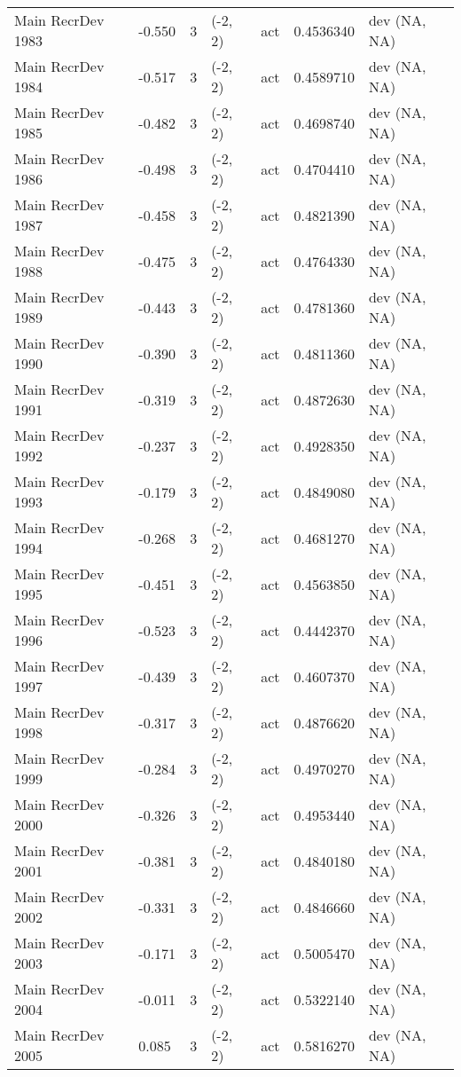 \documentclass[11pt,
  english,
  a4paper,
]{article}
\begin{document}
\begin{landscape}
\begin{longtable}[t]{>{\raggedright\arraybackslash}p{6cm}lllll>{\raggedright\arraybackslash}p{4cm}}
Main RecrDev 1983 & -0.550 & 3 & (-2, 2) & act & 0.4536340 & dev (NA, NA)\\
Main RecrDev 1984 & -0.517 & 3 & (-2, 2) & act & 0.4589710 & dev (NA, NA)\\
Main RecrDev 1985 & -0.482 & 3 & (-2, 2) & act & 0.4698740 & dev (NA, NA)\\
Main RecrDev 1986 & -0.498 & 3 & (-2, 2) & act & 0.4704410 & dev (NA, NA)\\
Main RecrDev 1987 & -0.458 & 3 & (-2, 2) & act & 0.4821390 & dev (NA, NA)\\
Main RecrDev 1988 & -0.475 & 3 & (-2, 2) & act & 0.4764330 & dev (NA, NA)\\
Main RecrDev 1989 & -0.443 & 3 & (-2, 2) & act & 0.4781360 & dev (NA, NA)\\
Main RecrDev 1990 & -0.390 & 3 & (-2, 2) & act & 0.4811360 & dev (NA, NA)\\
Main RecrDev 1991 & -0.319 & 3 & (-2, 2) & act & 0.4872630 & dev (NA, NA)\\
Main RecrDev 1992 & -0.237 & 3 & (-2, 2) & act & 0.4928350 & dev (NA, NA)\\
Main RecrDev 1993 & -0.179 & 3 & (-2, 2) & act & 0.4849080 & dev (NA, NA)\\
Main RecrDev 1994 & -0.268 & 3 & (-2, 2) & act & 0.4681270 & dev (NA, NA)\\
Main RecrDev 1995 & -0.451 & 3 & (-2, 2) & act & 0.4563850 & dev (NA, NA)\\
Main RecrDev 1996 & -0.523 & 3 & (-2, 2) & act & 0.4442370 & dev (NA, NA)\\
Main RecrDev 1997 & -0.439 & 3 & (-2, 2) & act & 0.4607370 & dev (NA, NA)\\
Main RecrDev 1998 & -0.317 & 3 & (-2, 2) & act & 0.4876620 & dev (NA, NA)\\
Main RecrDev 1999 & -0.284 & 3 & (-2, 2) & act & 0.4970270 & dev (NA, NA)\\
Main RecrDev 2000 & -0.326 & 3 & (-2, 2) & act & 0.4953440 & dev (NA, NA)\\
Main RecrDev 2001 & -0.381 & 3 & (-2, 2) & act & 0.4840180 & dev (NA, NA)\\
Main RecrDev 2002 & -0.331 & 3 & (-2, 2) & act & 0.4846660 & dev (NA, NA)\\
Main RecrDev 2003 & -0.171 & 3 & (-2, 2) & act & 0.5005470 & dev (NA, NA)\\
Main RecrDev 2004 & -0.011 & 3 & (-2, 2) & act & 0.5322140 & dev (NA, NA)\\
Main RecrDev 2005 & 0.085 & 3 & (-2, 2) & act & 0.5816270 & dev (NA, NA)\\

\end{longtable}
\end{landscape}
\end{document}
